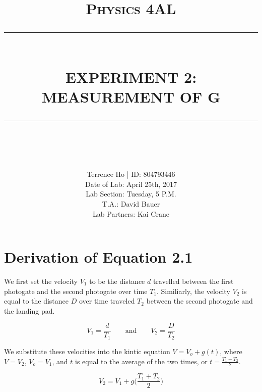 \documentclass[11pt]{report}
\newcommand{\HRule}[1]{\rule{\linewidth}{#1}}
\begin{document}
\title{ \normalsize \textsc{Physics 4AL}
        \\ [2.0cm]
        \HRule{0.5pt} \\
        \LARGE \textbf{\uppercase{Experiment 2: Measurement of g}}
        \HRule{2pt} \\ [0.5cm]
        \vspace*{2\baselineskip}}

\date{}

\author{
        Terrence Ho | ID: 804793446 \\ 
        Date of Lab: April 25th, 2017 \\
        Lab Section: Tuesday, 5 P.M.\\
        T.A.: David Bauer\\
        Lab Partners: Kai Crane}

\maketitle
\tableofcontents
\newpage

\sectionfont{\scshape}


\section*{Derivation of Equation 2.1}

\indent We first set the velocity \(V_1\) to be the distance \(d\) travelled between 
the first photogate and the second photogate over time \(T_1\).
Similiarly, the velocity \(V_2\) is equal to the distance \(D\) over time 
traveled \(T_2\) between the second photogate and the landing pad.

\[ V_1 = \frac{d}{T_1}   \qquad\text{and}\qquad     V_2 = \frac{D}{T_2} \]

We substitute these velocities into the kintic equation \(V = V_o + g(t) \),
where \(V = V_2\), \(V_o = V_1\), and \(t\) is equal to the average of the two
times, or \(t = \frac{T_1 + T_2}{2} \).

\[ V_2 = V_1 + g\Bigg(\frac{T_1 + T_2}{2}\Bigg) \]
\end{document}

